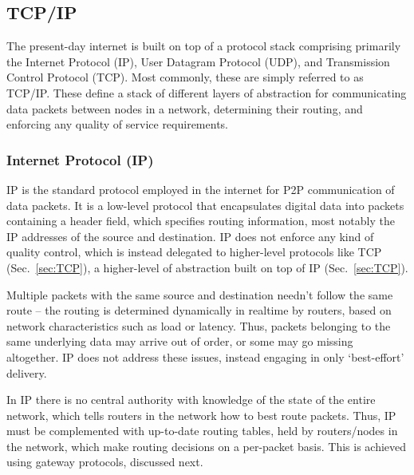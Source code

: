 \documentclass[aps, rmp, twocolumn, amsmath, amssymb, nofootinbib, superscriptaddress, longbibliography, floatfix, table-of-contents, eqsecnum]{revtex4-1}
\begin{document}
%
%

\subsection{TCP/IP} 

The present-day internet is built on top of a protocol stack comprising primarily the Internet Protocol (IP), User Datagram Protocol (UDP), and Transmission Control Protocol (TCP). Most commonly, these are simply referred to as TCP/IP. These define a stack of different layers of abstraction for communicating data packets between nodes in a network, determining their routing, and enforcing any quality of service requirements.

%
%

\subsubsection{Internet Protocol (IP)} 

IP is the standard protocol employed in the internet for P2P communication of data packets. It is a low-level protocol that encapsulates digital data into packets containing a header field, which specifies routing information, most notably the IP addresses of the source and destination. IP does not enforce any kind of quality control, which is instead delegated to higher-level protocols like TCP (Sec.~\ref{sec:TCP}), a higher-level of abstraction built on top of IP (Sec.~\ref{sec:TCP}).

Multiple packets with the same source and destination needn't follow the same route -- the routing is determined dynamically in realtime by routers, based on network characteristics such as load or latency. Thus, packets belonging to the same underlying data may arrive out of order, or some may go missing altogether. IP does not address these issues, instead engaging in only `best-effort' delivery. 

In IP there is no central authority with knowledge of the state of the entire network, which tells routers in the network how to best route packets. Thus, IP must be complemented with up-to-date routing tables, held by routers/nodes in the network, which make routing decisions on a per-packet basis. This is achieved using gateway protocols, discussed next.

%
%
\end{document}
